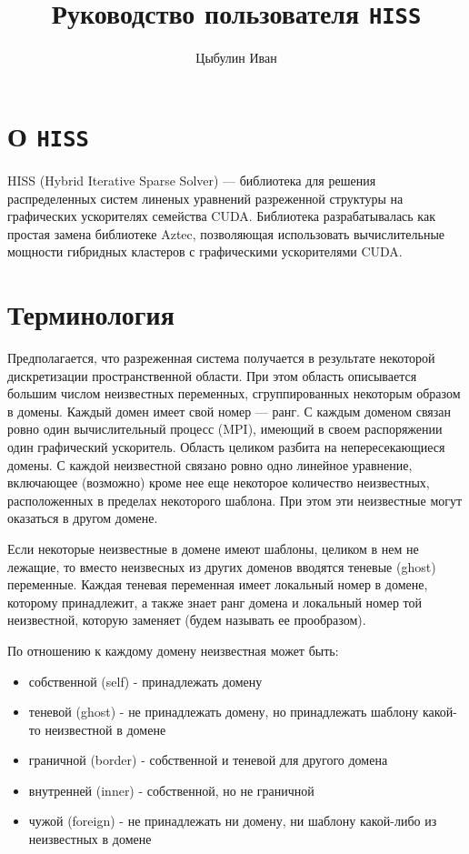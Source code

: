 \documentclass[12pt]{article}
\author{Цыбулин Иван}
\title{Руководство пользователя \texttt{HISS}}
\begin{document}
\maketitle
\section{О \texttt{HISS}}
HISS (Hybrid Iterative Sparse Solver) --- библиотека для решения распределенных
систем линеных уравнений разреженной структуры на графических ускорителях
семейства CUDA. Библиотека разрабатывалась как простая замена библиотеке Aztec,
позволяющая использовать вычислительные мощности гибридных кластеров с
графическими ускорителями CUDA. 
\section{Терминология}
Предполагается, что разреженная система получается в результате некоторой
дискретизации пространственной области. При этом область описывается большим
числом неизвестных переменных, сгруппированных некоторым образом в домены.
Каждый домен имеет свой номер --- ранг.
С каждым доменом связан ровно один вычислительный процесс (MPI), имеющий в своем
распоряжении один графический ускоритель. Область целиком разбита на
непересекающиеся домены. С каждой неизвестной связано ровно одно линейное
уравнение, включающее (возможно) кроме нее еще некоторое количество неизвестных,
расположенных в пределах некоторого
шаблона. При этом эти неизвестные могут оказаться в другом домене. 

Если некоторые неизвестные в домене имеют шаблоны, целиком в нем не лежащие, то
вместо неизвесных из других доменов вводятся теневые (ghost) переменные. Каждая
теневая переменная имеет локальный номер в домене, которому принадлежит, а также
знает ранг домена и локальный номер той неизвестной, которую заменяет (будем
называть ее прообразом). 

По отношению к каждому домену неизвестная может быть:
\begin{itemize}
\item собственной (self) - принадлежать домену
\item теневой (ghost) - не принадлежать домену, но принадлежать шаблону
какой-то неизвестной в домене 
\item граничной (border) - собственной и теневой для другого домена
\item внутренней (inner) - собственной, но не граничной
\item чужой (foreign) - не принадлежать ни домену, ни шаблону какой-либо из
неизвестных в домене
\end{itemize}
\end{document}
